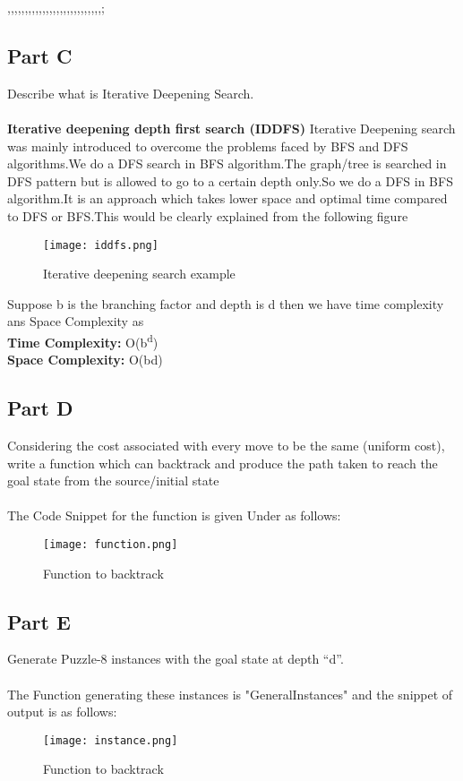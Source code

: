 ,,,,,,,,,,,,,,,,,,,,,,,,,,,;\documentclass[conference]{IEEEtran}
\begin{document}
\subsection{Part C}
Describe what is Iterative Deepening Search.
\\
\\
\textbf{Iterative deepening depth first search (IDDFS)} Iterative Deepening search was mainly introduced to overcome the problems faced by BFS and DFS algorithms.We do a DFS search in BFS algorithm.The graph/tree is searched in DFS pattern but is allowed to go to a certain depth only.So we do a DFS in BFS algorithm.It is an approach which takes lower space and  optimal time compared to DFS or BFS.This would be clearly explained from the following figure\cite{b1}
\begin{figure}[htbp]
\centerline{\texttt{[image: iddfs.png]}}
\caption{Iterative deepening search example\cite{b7}}
\label{fig}
\end{figure}
Suppose b is the branching factor and depth is d then we have time complexity ans Space Complexity as
\\
\textbf{Time Complexity:} O(b\textsuperscript{d})
\\
\textbf{Space Complexity:} O(bd)
\\
\subsection{Part D}
Considering the cost associated with every move to be the
same (uniform cost), write a function which can backtrack
and produce the path taken to reach the goal state from the
source/initial state
\\
\\
The Code Snippet for the function is given Under as follows:
\begin{figure}[htbp]
\centerline{\texttt{[image: function.png]}}
\caption{Function to backtrack}
\label{fig}
\end{figure}

\subsection{Part E}
\newline
Generate Puzzle-8 instances with the goal state at depth “d”.
\\
\\
The Function generating these instances is "GeneralInstances" and the snippet of output is as follows:
\begin{figure}[htbp]
\centerline{\texttt{[image: instance.png]}}
\caption{Function to backtrack}
\label{fig}
\end{figure}
\end{document}
